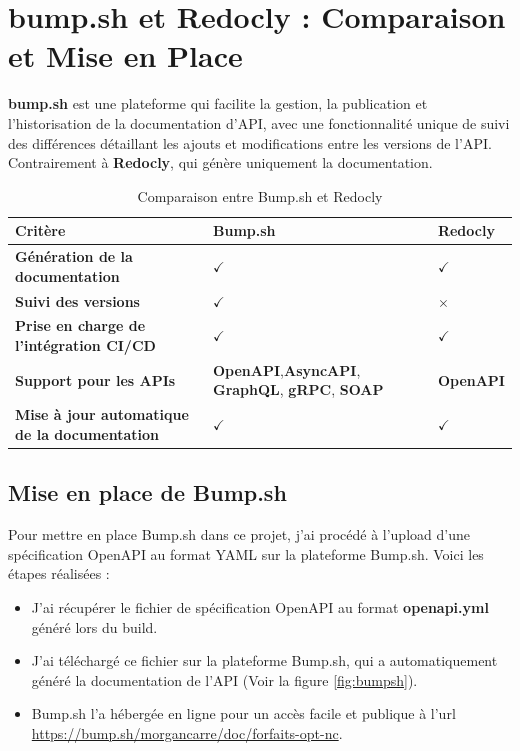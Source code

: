 \documentclass[11pt]{article}
\begin{document}
		\section{bump.sh et Redocly : Comparaison et Mise en Place}
		
		\textbf{bump.sh} est une plateforme qui facilite la gestion, la publication et l'historisation de la documentation d’API, avec une fonctionnalité unique de suivi des différences détaillant les ajouts et modifications entre les versions de l'API. Contrairement à \textbf{Redocly}, qui génère uniquement la documentation.
		\begin{table}[h!]
			\centering
			\begin{tabularx}{\textwidth}{|X|X|X|}
				\hline
				\textbf{Critère} & \textbf{Bump.sh} & \textbf{Redocly} \\
				\hline
				\textbf{Génération de la documentation} & $\checkmark$ & $\checkmark$ \\
				\hline
				\textbf{Suivi des versions} & $\checkmark$ & $\times$ \\
				\hline
				\textbf{Prise en charge de l'intégration CI/CD} & $\checkmark$ & $\checkmark$ \\
				\hline
				\textbf{Support pour les APIs} &  \textbf{OpenAPI},\textbf{AsyncAPI}, \textbf{GraphQL}, \textbf{gRPC}, \textbf{SOAP} & \textbf{OpenAPI} \\
				\hline
				\textbf{Mise à jour automatique de la documentation} & $\checkmark$ & $\checkmark$ \\
				\hline
			\end{tabularx}
			\caption{Comparaison entre Bump.sh et Redocly}
		\end{table}
		\subsection*{Mise en place de Bump.sh}
		
		Pour mettre en place Bump.sh dans ce projet, j'ai procédé à l'upload d'une spécification OpenAPI au format YAML sur la plateforme Bump.sh. Voici les étapes réalisées :
		
		\begin{itemize}
			\item J'ai récupérer le fichier de spécification OpenAPI au format \textbf{openapi.yml} généré lors du build.
			\item J'ai téléchargé ce fichier sur la plateforme Bump.sh, qui a automatiquement généré la documentation de l'API (Voir la figure \ref{fig:bumpsh}).
			\item Bump.sh l'a hébergée en ligne pour un accès facile et publique à l'url \url{https://bump.sh/morgancarre/doc/forfaits-opt-nc}.
		\end{itemize}
			
\end{document}
